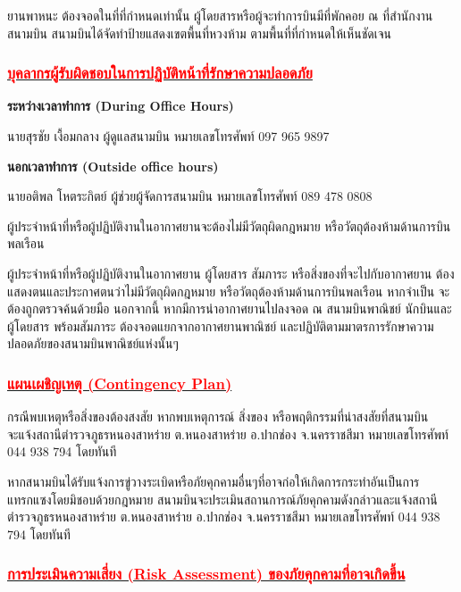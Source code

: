 ยานพาหนะ ต้องจอดในที่ที่กำหนดเท่านั้น    ผู้โดยสารหรือผู้จะทำการบินมีที่พักคอย ณ ที่สำนักงานสนามบิน
สนามบินได้จัดทำป้ายแสดงเขตพื้นที่หวงห้าม ตามพื้นที่ที่กำหนดให้เห็นชัดเจน

\subsubsection{\underline{\textcolor{red}{บุคลากรผู้รับผิดชอบในการปฏิบัติหน้าที่รักษาความปลอดภัย}}}

\textbf{ระหว่างเวลาทำการ (During Office Hours)}

นายสุรชัย เงื้อมกลาง ผู้ดูแลสนามบิน หมายเลขโทรศัพท์ 097 965 9897

\textbf{นอกเวลาทำการ (Outside office hours)}

นายอติพล โหตระกิตย์ ผู้ช่วยผู้จัดการสนามบิน หมายเลขโทรศัพท์ 089 478 0808

ผู้ประจำหน้าที่หรือผู้ปฏิบัติงานในอากาศยานจะต้องไม่มีวัตถุผิดกฎหมาย หรือวัตถุต้องห้ามด้านการบินพลเรือน  

ผู้ประจำหน้าที่หรือผู้ปฏิบัติงานในอากาศยาน ผู้โดยสาร สัมภาระ หรือสิ่งของที่จะไปกับอากาศยาน ต้องแสดงตนและประกาศตนว่าไม่มีวัตถุผิดกฎหมาย หรือวัตถุต้องห้ามด้านการบินพลเรือน หากจำเป็น จะต้องถูกตรวจค้นด้วยมือ  นอกจากนี้ หากมีการนำอากาศยานไปลงจอด ณ สนามบินพาณิชย์ นักบินและผู้โดยสาร พร้อมสัมภาระ ต้องจอดแยกจากอากาศยานพาณิชย์ และปฏิบัติตามมาตรการรักษาความปลอดภัยของสนามบินพาณิชย์แห่งนั้นๆ

\subsubsection{\underline{\textcolor{red}{แผนเผชิญเหตุ (Contingency Plan)}}}

กรณีพบเหตุหรือสิ่งของต้องสงสัย
หากพบเหตุการณ์ สิ่งของ หรือพฤติกรรมที่น่าสงสัยที่สนามบิน จะแจ้งสถานีตำรวจภูธรหนองสาหร่าย ต.หนองสาหร่าย อ.ปากช่อง จ.นครราชสีมา หมายเลขโทรศัพท์ 044 938 794 โดยทันที

หากสนามบินได้รับแจ้งการขู่วางระเบิดหรือภัยคุกคามอื่นๆที่อาจก่อให้เกิดการกระทำอันเป็นการแทรกแซงโดยมิชอบด้วยกฎหมาย สนามบินจะประเมินสถานการณ์ภัยคุกคามดังกล่าวและแจ้งสถานีตำรวจภูธรหนองสาหร่าย ต.หนองสาหร่าย อ.ปากช่อง จ.นครราชสีมา หมายเลขโทรศัพท์ 044 938 794 โดยทันที

\subsubsection{\underline{\textcolor{red}{การประเมินความเสี่ยง (Risk Assessment)  ของภัยคุกคามที่อาจเกิดขึ้น}}}

